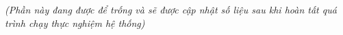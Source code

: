 \textit{(Phần này đang được để trống và sẽ được cập nhật số liệu sau khi hoàn tất quá trình chạy thực nghiệm hệ thống)}